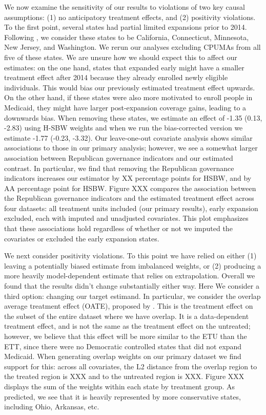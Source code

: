 \documentclass[12pt]{article}
\begin{document}
We now examine the sensitivity of our results to violations of two key causal assumptions: (1) no anticipatory treatment effects, and (2) positivity violations. To the first point, several states had partial limited expansions prior to 2014. Following \cite{frean2017premium}, we consider these states to be California, Connecticut, Minnesota, New Jersey, and Washington. We rerun our analyses excluding CPUMAs from all five of these states. We are unsure how we should expect this to affect our estimates: on the one hand, states that expanded early might have a smaller treatment effect after 2014 because they already enrolled newly eligible individuals. This would bias our previously estimated treatment effect upwards. On the other hand, if these states were also more motivated to enroll people in Medicaid, they might have larger post-expansion coverage gains, leading to a downwards bias. When removing these states, we estimate an effect of -1.35 (0.13, -2.83) using H-SBW weights and when we run the bias-corrected version we estimate -1.77 (-0.23, -3.32). Our leave-one-out covariate analysis shows similar associations to those in our primary analysis; however, we see a somewhat larger association between Republican governance indicators and our estimated contrast. In particular, we find that removing the Republican governance indicators increases our estimator by XX percentage points for HSBW, and by AA percentage point for HSBW. Figure XXX compares the association between the Republican governance indicators and the estimated treatment effect across four datasets: all treatment units included (our primary results), early expansion excluded, each with imputed and unadjusted covariates. This plot emphasizes that these associations hold regardless of whether or not we imputed the covariates or excluded the early expansion states.

We next consider positivity violations. To this point we have relied on either (1) leaving a potentially biased estimate from imbalanced weights, or (2) producing a more heavily model-dependent estimate that relies on extrapolation. Overall we found that the results didn't change substantially either way. Here We consider a third option: changing our target estimand. In particular, we consider the overlap average treatment effect (OATE), proposed by \cite{li2018balancing}. This is the treatment effect on the subset of the entire dataset where we have overlap. It is a data-dependent treatment effect, and is not the same as the treatment effect on the untreated; however, we believe that this effect will be more similar to the ETU than the ETT, since there were no Democratic controlled states that did not expand Medicaid. When generating overlap weights on our primary dataset we find support for this: across all covariates, the L2 distance from the overlap region to the treated region is XXX and to the untreated region is XXX. Figure XXX displays the sum of the weights within each state by treatment group. As predicted, we see that it is heavily represented by more conservative states, including Ohio, Arkansas, etc.
\end{document}
